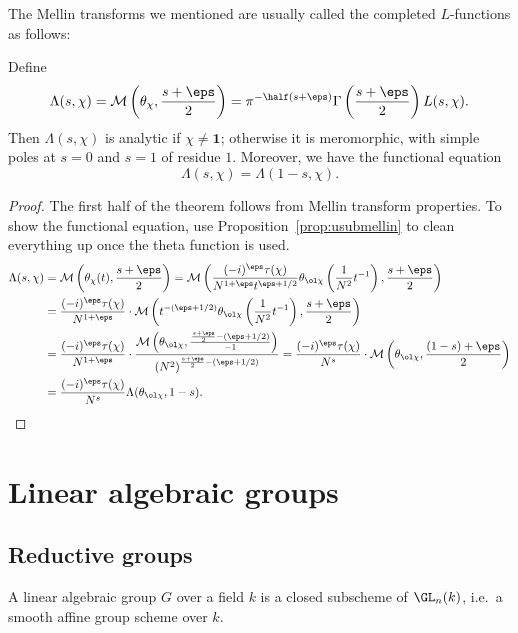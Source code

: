 The Mellin transforms we mentioned are usually
called the completed $L$-functions as follows:
\begin{theorem}
  Define
  \[ \Lambda(s, \chi)
    = \MM\left( \theta_\chi, \frac{s+\eps}{2} \right)
    = \pi^{-\half(s+\eps)}
    \Gamma\left( \frac{s+\eps}{2} \right) L(s, \chi).  \]
  Then $\Lambda(s, \chi)$ is analytic if $\chi \ne \mathbf 1$;
  otherwise it is meromorphic,
  with simple poles at $s = 0$ and $s = 1$ of residue $1$.
  Moreover, we have the functional equation
  \[ \Lambda(s, \chi) = \Lambda(1-s, \chi). \]
\end{theorem}

\begin{proof}
The first half of the theorem follows from Mellin transform properties.
To show the functional equation, use Proposition~\ref{prop:usubmellin}
to clean everything up once the theta function is used.
\begin{align*}
  \Lambda(s, \chi) &= \MM\left(\theta_\chi(t),
    \frac{s+\eps}{2} \right)
  = \MM\left(
    \frac{(-i)^{\eps} \tau(\chi)}{N^{1+\eps} t^{\eps+1/2}}
    \theta_{\ol\chi}
    \left( \frac{1}{N^2} t^{-1} \right),
    \frac{s+\eps}{2} \right) \\
  &= \frac{(-i)^{\eps} \tau(\chi)}{N^{1+\eps}}
    \cdot \MM\left( t^{-(\eps+1/2)}\theta_{\ol\chi}
    \left( \frac{1}{N^2} t^{-1} \right),
    \frac{s+\eps}{2} \right) \\
  &= \frac{(-i)^{\eps} \tau(\chi)}{N^{1+\eps}}
    \cdot \frac{\MM\left( \theta_{\ol\chi},
    \frac{\frac{s+\eps}{2} - (\eps + 1/2)}{-1} \right)}
    {\left( N^2 \right)^{\frac{s+\eps}{2} - (\eps+1/2)}}
  = \frac{(-i)^{\eps} \tau(\chi)}{N^{s}}
    \cdot \MM\left( \theta_{\ol\chi},
    \frac{(1-s)+\eps}{2}\right) \\
  &= \frac{(-i)^{\eps} \tau(\chi)}{N^{s}}
    \Lambda(\theta_{\ol\chi}, 1-s). \qedhere
\end{align*}
\end{proof}

\section{Linear algebraic groups}
\subsection{Reductive groups}
\begin{definition}
  A linear algebraic group $G$ over a field $k$ is a closed subscheme
  of $\GL_n(k)$, i.e.\ a smooth affine group scheme over $k$.
\end{definition}


